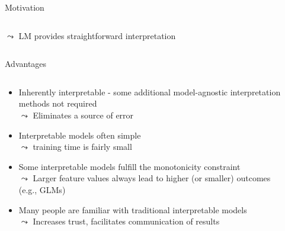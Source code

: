 \documentclass[11pt,compress,t,notes=noshow, aspectratio=169, xcolor=table]{beamer}
\begin{document}
\begin{frame}{Motivation}
\begin{columns}[T, totalwidth = \linewidth]
\begin{column}{0.45\textwidth}
  \begin{center}
    $\leadsto$ LM provides straightforward interpretation
  \end{center}
    \end{column}
\end{columns}
\end{frame}

\begin{frame}{Advantages}
\begin{columns}[T, totalwidth=\textwidth]
\begin{column}{0.72\textwidth}
    \begin{itemize}[<+->]
    \itemsep1em
        \item Inherently interpretable - some additional model-agnostic interpretation methods not required \\
        $\leadsto$ Eliminates a source of error
        \item Interpretable models often simple \\
        $\leadsto$ training time is fairly small
        \item Some interpretable models fulfill the monotonicity constraint \\
        $\leadsto$ Larger feature values always lead to higher (or smaller) outcomes (e.g., GLMs)
        \item Many people are familiar with traditional interpretable models \\
        $\leadsto$ Increases trust, facilitates communication of results
    \end{itemize}
\end{column}
\begin{column}{0.28\textwidth}
    \begin{center}
\end{center}
\end{column}
\end{columns}
\end{frame}
\end{document}
